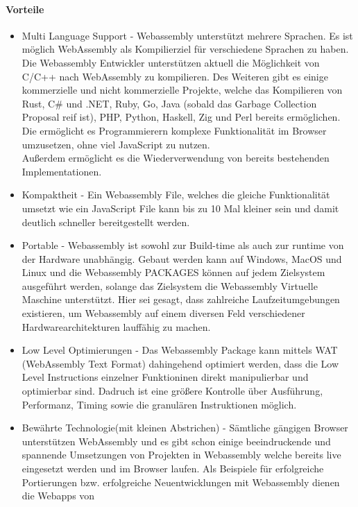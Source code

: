 \paragraph*{Vorteile}
\begin{itemize}
    \item   Multi Language Support - Webassembly unterstützt mehrere Sprachen. Es ist möglich WebAssembly als Kompilierziel für verschiedene Sprachen zu haben. \\
            Die Webassembly Entwickler unterstützen aktuell die Möglichkeit von C/C++ nach WebAssembly zu kompilieren. Des Weiteren gibt es einige kommerzielle und nicht kommerzielle
            Projekte, welche das Kompilieren von Rust, C\# und .NET, Ruby, Go, Java (sobald das Garbage Collection Proposal reif ist), PHP, Python, Haskell, Zig und Perl bereits ermöglichen.\\
            Die ermöglicht es Programmierern komplexe Funktionalität im Browser umzusetzen, ohne viel JavaScript zu nutzen. \\
            Außerdem ermöglicht es die Wiederverwendung von bereits bestehenden Implementationen.
    \item   Kompaktheit - Ein Webassembly File, welches die gleiche Funktionalität umsetzt wie ein JavaScript File kann bis zu 10 Mal kleiner sein und damit deutlich schneller bereitgestellt werden.
    \item   Portable - Webassembly ist sowohl zur Build-time als auch zur runtime von der Hardware unabhängig. Gebaut werden kann auf Windows, MacOS und Linux und die Webassembly PACKAGES
            können auf jedem Zielsystem ausgeführt werden, solange das Zielsystem die Webassembly Virtuelle Maschine unterstützt. Hier sei gesagt, dass zahlreiche Laufzeitumgebungen existieren, um 
            Webassembly auf einem diversen Feld verschiedener Hardwarearchitekturen lauffähig zu machen. 
    \item   Low Level Optimierungen - Das Webassembly Package kann mittels WAT (WebAssembly Text Format) dahingehend optimiert werden, dass die Low Level Instructions einzelner Funktioninen
            direkt manipulierbar und optimierbar sind. Dadruch ist eine größere Kontrolle über Ausführung, Performanz, Timing sowie die granulären Instruktionen möglich.
    \item   Bewährte Technologie(mit kleinen Abstrichen) - Sämtliche gängigen Browser unterstützen WebAssembly und es gibt schon einige beeindruckende und spannende Umsetzungen von Projekten in Webassembly
            welche bereits live eingesetzt werden und im Browser laufen. Als Beispiele für erfolgreiche Portierungen bzw. erfolgreiche Neuentwicklungen mit Webassembly dienen die Webapps von

\end{itemize}
